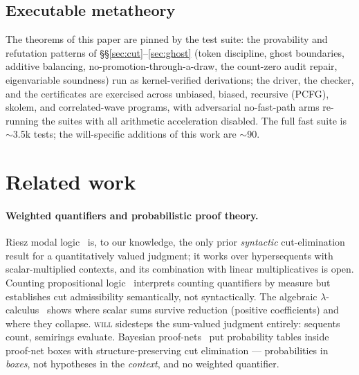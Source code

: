 \documentclass[11pt]{article}
\newcommand{\will}{\textsc{will}}                %
\theoremstyle{definition}
\theoremstyle{remark}
\begin{document}
\subsection{Executable metatheory}

The theorems of this paper are pinned by the test suite: the
provability and refutation patterns of
\S\S\ref{sec:cut}--\ref{sec:ghost} (token discipline, ghost boundaries,
additive balancing, no-promotion-through-a-draw, the count-zero audit
repair, eigenvariable soundness) run as kernel-verified derivations;
the driver, the checker, and the certificates are exercised across
unbiased, biased, recursive (PCFG), skolem, and correlated-wave
programs, with adversarial no-fast-path arms re-running the suites
with all arithmetic acceleration disabled.  The full fast suite is
$\sim$3.5k tests; the will-specific additions of this work are
$\sim$90.

\section{Related work}
\label{sec:related}

\paragraph{Weighted quantifiers and probabilistic proof theory.}
Riesz modal logic~\cite{LucasMio2022} is, to our knowledge, the only
prior \emph{syntactic} cut-elimination result for a quantitatively
valued judgment; it works over hypersequents with scalar-multiplied
contexts, and its combination with linear multiplicatives is open.
Counting propositional logic~\cite{AntonelliDLP2022} interprets
counting quantifiers by measure but establishes cut admissibility
semantically, not syntactically.  The algebraic
$\lambda$-calculus~\cite{Vaux2009} shows where scalar sums survive
reduction (positive coefficients) and where they collapse.  \will{}
sidesteps the sum-valued judgment entirely: sequents count, semirings
evaluate.  Bayesian proof-nets~\cite{DiGuardiaEF2024,DiGuardiaEEF2026} put probability
tables inside proof-net boxes with structure-preserving cut
elimination --- probabilities in \emph{boxes}, not hypotheses in the
\emph{context}, and no weighted quantifier.
\end{document}
